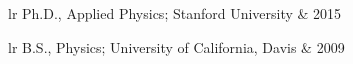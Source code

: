 \begin{cvlist}
  \item \begin{cvtabular}{lr} Ph.D., Applied Physics; Stanford University & 2015 \end{cvtabular}
  \item \begin{cvtabular}{lr}
    B.S., Physics; University of California, Davis & 2009
    \end{cvtabular}
\end{cvlist}
